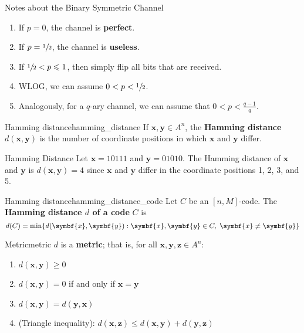 \begin{Definition}{Notes about the Binary Symmetric Channel}{}
    \begin{enumerate}[label=(\Roman*)]
        \item If $ p=0 $, the channel is \textbf{perfect}.
        \item If $ p=\sfrac{1}{2} $, the channel is \textbf{useless}.
        \item If $ \sfrac{1}{2}<p\leqslant 1 $, then simply flip all bits that are received.
        \item WLOG, we can assume $ 0<p<\sfrac{1}{2} $.
        \item Analogously, for a $ q $-ary channel, we can assume that $ 0<p<\frac{q-1}{q} $.
    \end{enumerate}
\end{Definition}

\begin{Definition}{Hamming distance}{hamming_distance}
    If $ \symbf{x},\symbf{y}\in A^n $, the \textbf{Hamming distance} $ d(\symbf{x},\symbf{y}) $ is
    the number of coordinate positions in which $ \symbf{x} $ and $ \symbf{y} $ differ.
\end{Definition}

\begin{Example}{Hamming Distance}{}
    Let $ \symbf{x} = 10111 $ and $ \symbf{y} = 01010 $. The Hamming distance
    of $ \symbf{x} $ and $ \symbf{y} $ is $  d(\symbf{x},\symbf{y})=4  $
    since $ \symbf{x} $ and $ \symbf{y} $ differ in the coordinate positions
    1, 2, 3, and 5.
\end{Example}

\begin{Definition}{Hamming distance}{hamming_distance_code}
    Let $ C $ be an $ [n,M] $-code.
    The \textbf{Hamming distance $ d $ of a code} $ C $ is
    \[ d(C)=\min \set{d(\symbf{x},\symbf{y}):\symbf{x},\symbf{y}\in C,\;\symbf{x}\neq \symbf{y}} \]
\end{Definition}

\begin{Theorem}{Metric}{metric}
    $ d $ is a \textbf{metric}; that is, for all $ \symbf{x},\symbf{y},\symbf{z}\in A^n $:
    \begin{enumerate}[label=(\arabic*)]
        \item\label{thm:metric:1} $ d(\symbf{x},\symbf{y})\geqslant 0 $
        \item\label{thm:metric:2} $ d(\symbf{x},\symbf{y})=0 $ if and only if
              $ \symbf{x}=\symbf{y} $
        \item\label{thm:metric:3} $ d(\symbf{x},\symbf{y})=d(\symbf{y},\symbf{x}) $
        \item\label{thm:metric:4} (Triangle inequality): $ d(\symbf{x},\symbf{z})\leqslant
                  d(\symbf{x},\symbf{y})+d(\symbf{y},\symbf{z}) $
    \end{enumerate}
\end{Theorem}

